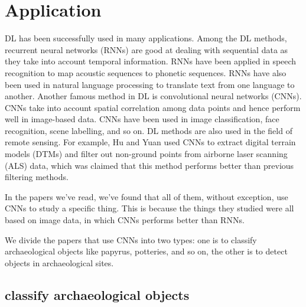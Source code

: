 \documentclass[journal]{IEEEtran}
\begin{document}
	
	\section{Application}\label{application}

	DL has been successfully used in many applications. Among the DL
	methods, recurrent neural networks (RNNs) are good at dealing with sequential data as they
	take into account temporal information. RNNs have been applied in speech recognition to
	map acoustic sequences to phonetic sequences. RNNs have also been used in natural
	language processing to translate text from one language to another. Another
	famous method in DL is convolutional neural networks (CNNs). CNNs take into
	account spatial correlation among data points and hence perform well in image-based data.
	CNNs have been used in image classification, face recognition,
	scene labelling, and so on. DL methods are also used in the field of remote sensing.
	For example, Hu and Yuan used CNNs to extract digital terrain models (DTMs) and filter out non-ground
	points from airborne laser scanning (ALS) data, which was claimed that this method performs better than
	previous filtering methods\cite{HuXiangyun2016DCfD}.

	In the papers we've read, we've found that all of them, without exception, use CNNs to study a specific thing.
	This is because the things they studied were all based on image data, in which CNNs performs better than RNNs.

	We divide the papers that use CNNs into two types: one is to classify archaeological objects like papyrus, potteries, and so on, the other is to detect objects in archaeological sites.

	\subsection{classify archaeological objects}
\end{document}
